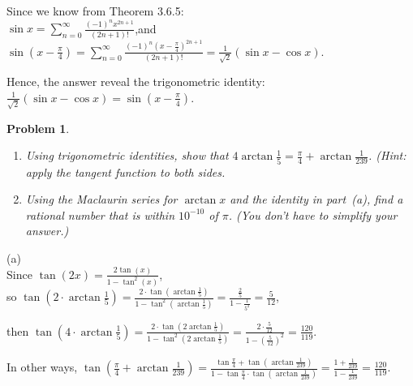 \documentclass[12pt,reqno]{amsart}
\newtheorem{problem}{Problem}
\begin{document}
Since we know from Theorem 3.6.5: 
\\$\sin x=\sum\limits_{n=0}^{\infty}\frac{(-1)^n x^{2n+1}}{(2n+1)!} $,and $\sin (x-\frac{\pi}{4})=\sum\limits_{n=0}^{\infty}\frac{(-1)^n (x-\frac{\pi}{4})^{2n+1}}{(2n+1)!}=\frac{1}{\sqrt{2}}(\sin x-\cos x)$.

Hence, the answer reveal the trigonometric identity: $\frac{1}{\sqrt{2}}(\sin x-\cos x)=\sin (x-\frac{\pi}{4})$.

\medskip
\begin{problem}\
\begin{enumerate}
\item Using trigonometric identities, show that $\displaystyle4\arctan\frac15 = \frac\pi4 + \arctan\frac1{239}$. (Hint: apply the tangent function to both sides.
\item Using the Maclaurin series for $\arctan x$ and the identity in part~(a), find a rational number that is within $10^{-10}$ of $\pi$. (You don't have to simplify your answer.)
\end{enumerate}
\end{problem}

(a)
\\Since $\tan(2x)=\frac{2\tan(x)}{1-\tan^2(x)}$,\\
so $\tan(2\cdot \arctan\frac{1}{5})=\frac{2\cdot \tan (\arctan \frac{1}{5})} {1-\tan^2(\arctan \frac{1}{5})   } =\frac{\frac{2}{5}}{1-\frac{1}{5^2}} =\frac{5}{12}    $,

then $\tan(4\cdot \arctan\frac{1}{5})=\frac{2\cdot \tan (2\arctan \frac{1}{5})} {1-\tan^2(2\arctan \frac{1}{5})   } =\frac{2\cdot \frac{5}{12}}{1-(\frac{5}{12})^2} =\frac{120}{119}    $.

In other ways, $\tan(\frac{\pi}{4}+ \arctan\frac{1}{239})=\frac{\tan \frac{\pi}{4}+ \tan (\arctan \frac{1}{239})} {1-\tan \frac{\pi}{4} \cdot\tan (\arctan \frac{1}{239})   } =\frac{1+ \frac{1}{239}}{1-\frac{1}{239}} =\frac{120}{119}.   $
\end{document}

